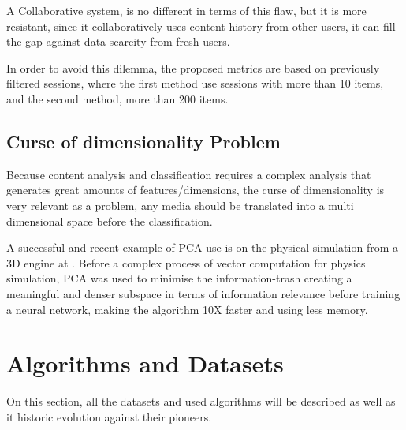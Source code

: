 \documentclass[ecp,tc,english]{iiufrgs}
\begin{document}
        A Collaborative system, is no different in terms of this flaw, but it is more resistant, since it collaboratively uses content history from other users, it can fill the gap against data scarcity from fresh users.
        
        In order to avoid this dilemma, the proposed metrics are based on previously filtered sessions, where the first method use sessions with more than 10 items, and the second method, more than 200 items.
    
        \subsection{Curse of dimensionality Problem}
        Because content analysis and classification requires a complex analysis that generates great amounts of features/dimensions, the curse of dimensionality is very relevant as a problem, any media should be translated into a multi dimensional space before the classification.
        
        A successful and recent example of PCA use is on the physical simulation from a 3D engine at \cite{10.1145/3309486.3340245}. Before a complex process of vector computation for physics simulation, PCA was used to minimise the information-trash creating a meaningful and denser subspace in terms of information relevance before training a neural network, making the algorithm 10X faster and using less memory.

        
    \section{Algorithms and Datasets}
    
    On this section, all the datasets and used algorithms will be described as well as it historic evolution against their pioneers.
    
        
        
\end{document}
